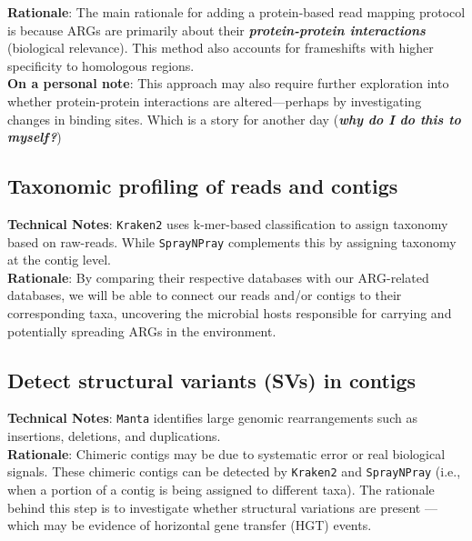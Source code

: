 \documentclass[11pt]{report}
\begin{document}
\textbf{Rationale}: The main rationale for adding a protein-based read mapping protocol is because ARGs are primarily about their \textit{\textbf{protein-protein interactions}} (biological relevance). This method also accounts for frameshifts with higher specificity to homologous regions. \\
\textbf{On a personal note}: This approach may also require further exploration into whether protein-protein interactions are altered—perhaps by investigating changes in binding sites. Which is a story for another day (\textit{\textbf{why do I do this to myself?}})

\subsection{Taxonomic profiling of reads and contigs}
\textbf{Technical Notes}: \texttt{Kraken2} uses k-mer-based classification to assign taxonomy based on raw-reads. While \texttt{SprayNPray} complements this by assigning taxonomy at the contig level. \\
\textbf{Rationale}: By comparing their respective databases with our ARG-related databases, we will be able to connect our reads and/or contigs to their corresponding taxa, uncovering the microbial hosts responsible for carrying and potentially spreading ARGs in the environment.

\subsection{Detect structural variants (SVs) in contigs}
\textbf{Technical Notes}: \texttt{Manta} identifies large genomic rearrangements such as insertions, deletions, and duplications. \\
\textbf{Rationale}: Chimeric contigs may be due to systematic error or real biological signals. These chimeric contigs can be detected by \texttt{Kraken2} and \texttt{SprayNPray} (i.e., when a portion of a contig is being assigned to different taxa). The rationale behind this step is to investigate whether structural variations are present — which may be evidence of horizontal gene transfer (HGT) events.
\end{document}

